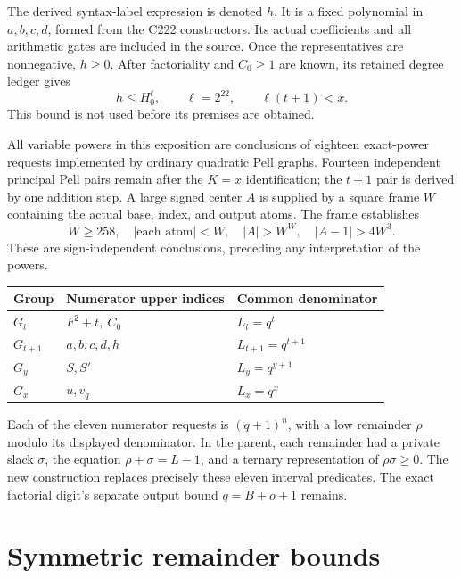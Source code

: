 \documentclass[11pt,letterpaper]{article}
\theoremstyle{definition}\newtheorem{definition}[theorem]{Definition}
\theoremstyle{remark}\newtheorem{remark}[theorem]{Remark}
\begin{document}
The derived syntax-label expression is denoted \(h\). It is a fixed polynomial in \(a,b,c,d\), formed from the C222 constructors. Its actual coefficients and all arithmetic gates are included in the source. Once the representatives are nonnegative, \(h\ge0\). After factoriality and \(C_0\ge1\) are known, its retained degree ledger gives
\begin{equation}\label{eq:hbound}
 h\le H_0^{\ell},\qquad \ell=2^{22},\qquad \ell(t+1)<x.
\end{equation}
This bound is not used before its premises are obtained.

All variable powers in this exposition are conclusions of eighteen exact-power requests implemented by ordinary quadratic Pell graphs. Fourteen independent principal Pell pairs remain after the \(K=x\) identification; the \(t+1\) pair is derived by one addition step. A large signed center \(A\) is supplied by a square frame \(W\) containing the actual base, index, and output atoms. The frame establishes
\begin{equation}\label{eq:frame}
 W\ge258,\quad |\text{each atom}|<W,\quad
 |A|>W^W,\quad |A-1|>4W^3.
\end{equation}
These are sign-independent conclusions, preceding any interpretation of the powers.

\begin{center}
\begin{tabular}{lll}
\toprule
Group & Numerator upper indices & Common denominator\\
\midrule
\(G_t\)&\(F^2+t,\ C_0\)&\(L_t=q^t\)\\
\(G_{t+1}\)&\(a,b,c,d,h\)&\(L_{t+1}=q^{t+1}\)\\
\(G_y\)&\(S,S'\)&\(L_y=q^{y+1}\)\\
\(G_x\)&\(u,v_q\)&\(L_x=q^x\)\\
\bottomrule
\end{tabular}
\end{center}
Each of the eleven numerator requests is \((q+1)^n\), with a low remainder \(\rho\) modulo its displayed denominator. In the parent, each remainder had a private slack \(\sigma\), the equation \(\rho+\sigma=L-1\), and a ternary representation of \(\rho\sigma\ge0\). The new construction replaces precisely these eleven interval predicates. The exact factorial digit's separate output bound \(q=B+o+1\) remains.

\section{Symmetric remainder bounds}\label{sec:remainders}
\end{document}
